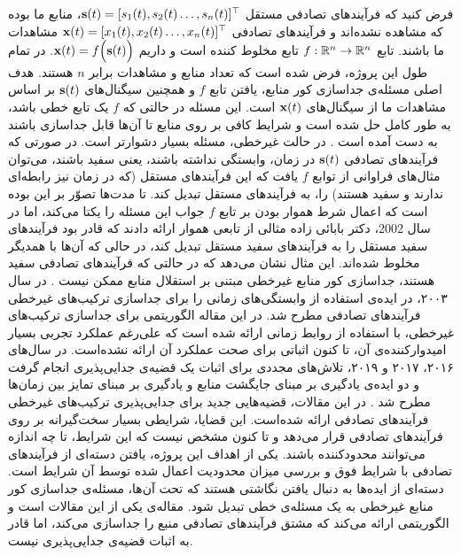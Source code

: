 فرض کنید که  فرآیند‌های تصادفی‌ مستقل
$\mathbf{s}(t) = [s_1(t), s_2(t) \dots, s_n(t)]^\top$،
منابع ما بوده که مشاهده نشده‌اند و فرآیند‌های تصادفی 
$\mathbf{x}(t) = [x_1(t), x_2(t) \dots, x_n(t)]^\top$
مشاهدات ما باشند.   تابع 
$f: \mathbb{R}^n \to \mathbb{R}^n$
تابع مخلوط کننده است و داریم 
$\mathbf{x}(t) = f\Big(\mathbf{s}(t)\Big)$.
در تمام طول این پروژه، فرض شده است که تعداد منابع و مشاهدات برابر $n$ هستند. هدف اصلی مسئله‌ی جداسازی کور منابع، یافتن تابع $f$ و همچنین سیگنال‌های 
$\mathbf{s}(t)$
بر اساس مشاهدات ما از سیگنال‌های 
$\mathbf{x}(t)$
است. این مسئله در حالتی که $f$ یک تابع خطی باشد، به طور کامل حل شده است و شرایط کافی بر روی منابع تا آن‌ها قابل جداسازی باشند به دست آمده است
\cite{ICAbook}.
در حالت غیرخطی، مسئله بسیار دشوارتر است.  در صورتی که فرآیند‌های تصادفی
$\mathbf{s}(t)$
در زمان، وابستگی نداشته باشند، یعنی سفید باشند، می‌توان مثال‌‌های فراوانی از توابع $f$ یافت که این فرآیند‌های مستقل  (که در زمان نیز رابطه‌ای ندارند و 
سفید هستند) را، به فرآیند‌های مستقل تبدیل کند. تا مدت‌ها تصوّر بر این بوده است که اعمال شرط هموار بودن بر تابع 
$f$
جواب این مسئله را یکتا می‌کند، اما در سال 2002، دکتر بابائی زاده مثالی از تابعی هموار ارائه‌ دادند که قادر بود فرآیند‌های سفید مستقل را به فرآیند‌های سفید مستقل تبدیل کند، در حالی که آن‌ها با همدیگر مخلوط ‌شده‌اند. این مثال نشان می‌دهد که در حالتی که فرآیند‌های تصادفی سفید هستند، جداسازی کور منابع غیرخطی مبتنی بر استقلال منابع ممکن نیست
\cite{mbzadehthesis}.
 در سال ۲۰۰۳، در
\cite{harmeling2003kernel}
ایده‌ی استفاده از وابستگی‌های زمانی را برای جداسازی ترکیب‌های غیرخطی فرآیند‌های تصادفی مطرح شد. در این مقاله‌ الگوریتمی برای جداسازی ترکیب‌های غیرخطی، با استفاده از روابط زمانی ارائه شده است که علی‌رغم عملکرد تجربی بسیار امیدوارکننده‌ی آن،  تا کنون اثباتی برای صحت عملکرد آن ارائه نشده‌است.  در سال‌های ۲۰۱۶، ۲۰۱۷ و ۲۰۱۹، تلاش‌های مجددی برای اثبات یک قضیه‌ی جدایی‌پذیری انجام گرفت و  دو ایده‌ی یادگیری بر مبنای جایگشت منابع
 و یادگیری بر مبنای تمایز بین زمان‌ها 
  مطرح شد
\cite{TCL, PCL, newHyva}.
در این مقالات، قضیه‌هایی جدید برای جدایی‌پذیری ترکیب‌های غیرخطی فرآیند‌های تصادفی ارائه‌ شده‌است. این قضایا، شرایطی بسیار سخت‌گیرانه بر روی فرآیند‌های تصادفی قرار می‌دهد و تا کنون مشخص نیست که این شرایط، تا چه اندازه می‌توانند محدود‌کننده باشند. یکی از اهداف این پروژه، یافتن دسته‌ای از فرآیند‌های تصادفی با شرایط فوق و بررسی میزان محدودیت اعمال شده توسط آن شرایط است. دسته‌ای از ایده‌ها به دنبال یافتن نگاشتی  هستند که تحت آن‌ها، مسئله‌ی جداسازی کور منابع غیرخطی به یک مسئله‌ی خطی تبدیل شود. مقاله‌ی 
\cite{ehsandoust}
یکی از این مقالات است و الگوریتمی ارائه می‌کند که مشتق فرآیند‌های تصادفی منبع را جداسازی می‌کند، اما قادر به اثبات قضیه‌ی جدایی‌پذیری نیست. 

